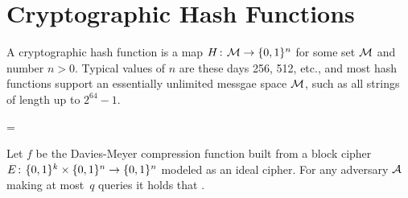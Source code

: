 \section{Cryptographic Hash Functions}
\label{sec:hashfunctions}

A cryptographic hash function is a map $H{{\kern .05em}\colon{\kern .05em}}{\cal M}\rightarrow\{0,1\}^n$ for
some set ${\cal M}$ and number $n > 0$. Typical values of $n$ are these days
256, 512, etc., and most hash functions support an essentially unlimited messgae
space ${\cal M}$, such as all strings of length up to $2^{64}-1$.



\bnm
{} = 
\enm





\begin{theorem*}
Let $f$ be the Davies-Meyer compression function built from a block cipher
$E{{\kern .05em}\colon{\kern .05em}}\{0,1\}^k\times\{0,1\}^n\rightarrow\{0,1\}^n$ modeled as an ideal
cipher. For any adversary ${\mathcal A}$ making at most~$q$ queries it holds that
\bnm
   \le {} \;.
\enm
\end{theorem*}

